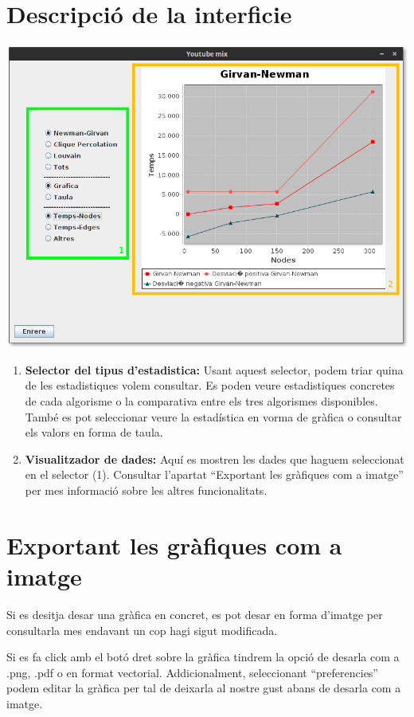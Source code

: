 \documentclass[letterpaper,10pt,oneside]{sphinxmanual}
\begin{document}
\section{Descripció de la interficie}
\label{consult_estad:descripcio-de-la-interficie}
\includegraphics{consult_est.png}
\begin{enumerate}
\item {} 
\textbf{Selector del tipus d'estadistica:} Usant aquest selector, podem triar quina de les estadistiques volem consultar. Es poden veure estadistiques concretes de cada algorisme o la comparativa entre els tres algorismes disponibles. També es pot seleccionar veure la estadística en vorma de gràfica o consultar els valors en forma de taula.

\item {} 
\textbf{Visualitzador de dades:} Aquí es mostren les dades que haguem seleccionat en el selector (1). Consultar l'apartat ``Exportant les gràfiques com a imatge'' per mes informació sobre les altres funcionalitats.

\end{enumerate}


\section{Exportant les gràfiques com a imatge}
\label{consult_estad:exportant-les-grafiques-com-a-imatge}
Si es desitja desar una gràfica en concret, es pot desar en forma d'imatge per consultarla mes endavant un cop hagi sigut modificada.

Si es fa click amb el botó dret sobre la gràfica tindrem la opció de desarla com a .png, .pdf o en format vectorial.
Addicionalment, seleccionant ``preferencies'' podem editar la gràfica per tal de deixarla al nostre gust abans de desarla com a imatge.



\renewcommand{\indexname}{Índex}
\printindex
\end{document}
